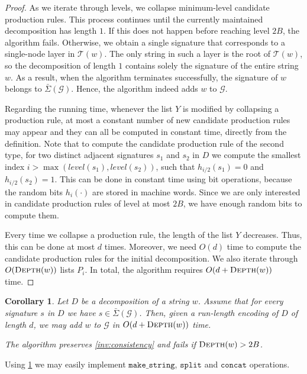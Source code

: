 \documentclass[a4paper]{article}
\newtheorem{corollary}[theorem]{Corollary}
\theoremstyle{remark}
\newcommand{\makeop}{\mathtt{make\_string}}
\newcommand{\concop}{\mathtt{concat}}
\newcommand{\splitop}{\mathtt{split}}
\newcommand{\sigs}{\bar{\Sigma}}
\newcommand{\depth}{\textsc{Depth}}
\newcommand{\str}{w}
\newcommand{\hs}{h}
\newcommand{\grammar}{\mathcal{G}}
\newcommand{\mword}{B}
\newcommand{\decomp}{D}
\newcommand{\slev}{\textit{level}}
\newcommand{\stree}{\mathcal{T}}
\begin{document}
\begin{proof}
As we iterate through levels, we collapse minimum-level candidate production rules.
This process continues until the currently maintained decomposition has length $1$.
If this does not happen before reaching level $2\mword$, the algorithm fails.
Otherwise, we obtain a single signature that corresponds to a single-node layer in $\stree(\str)$.
The only string in such a layer is the root of $\stree(\str)$, so the decomposition of length $1$ contains solely the signature of the entire string $\str$.
As a result, when the algorithm terminates successfully, the signature of $\str$ belongs to $\sigs(\grammar)$.
Hence, the algorithm indeed adds $\str$ to $\grammar$.

Regarding the running time, whenever the list $Y$ is modified by collapsing a production rule, at most a constant number of new candidate production rules may appear and they can all be computed in constant time, directly from the definition.
Note that to compute the candidate production rule of the second type, for two distinct adjacent signatures $s_1$ and $s_2$ in $\decomp$ we compute the smallest index $i > \max(\slev(s_1), \slev(s_2))$, such that $\hs_{i/2}(s_1) = 0$ and $\hs_{i/2}(s_2) = 1$.
This can be done in constant time using bit operations, because the random bits $\hs_i(\cdot)$ are stored in machine words.
Since we are only interested in candidate production rules of level at most $2\mword$, we have enough random bits to compute them.

Every time we collapse a production rule, the length of the list $Y$ decreases.
Thus, this can be done at most $d$ times.
Moreover, we need $O(d)$ time to compute the candidate production rules for the initial decomposition.
We also iterate through $O(\depth(\str))$ lists $P_i$.
In total, the algorithm requires $O(d + \depth(\str))$ time.
\end{proof}

\begin{corollary}\label{cor:decomposition-to-sig}
Let $\decomp$ be a decomposition of a string $w$.
Assume that for every signature $s$ in $\decomp$ we have $s \in \sigs(\grammar)$.
Then, given a run-length encoding of $\decomp$ of length $d$, we may add $w$ to $\grammar$ in $O(d + \depth(w))$ time.

The algorithm preserves \cref{inv:consistency} and fails if $\depth(w)>2\mword$.
\end{corollary}

Using \cref{cor:decomposition-to-sig} we may easily implement $\makeop$, $\splitop$ and $\concop$ operations.
\end{document}
